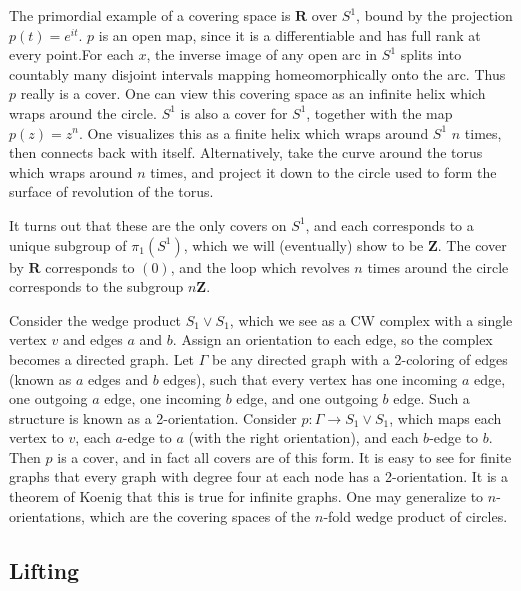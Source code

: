 \begin{example}
    The primordial example of a covering space is $\mathbf{R}$ over $S^1$, bound by the projection $p(t) = e^{it}$. $p$ is an open map, since it is a differentiable and has full rank at every point.For each $x$, the inverse image of any open arc in $S^1$ splits into countably many disjoint intervals mapping homeomorphically onto the arc. Thus $p$ really is a cover. One can view this covering space as an infinite helix which wraps around the circle. $S^1$ is also a cover for $S^1$, together with the map $p(z) = z^n$. One visualizes this as a finite helix which wraps around $S^1$ $n$ times, then connects back with itself. Alternatively, take the curve around the torus which wraps around $n$ times, and project it down to the circle used to form the surface of revolution of the torus.
\end{example}

It turns out that these are the only covers on $S^1$, and each corresponds to a unique subgroup of $\pi_1(S^1)$, which we will (eventually) show to be $\mathbf{Z}$. The cover by $\mathbf{R}$ corresponds to $(0)$, and the loop which revolves $n$ times around the circle corresponds to the subgroup $n \mathbf{Z}$.

\begin{example}
    Consider the wedge product $S_1 \vee S_1$, which we see as a CW complex with a single vertex $v$ and edges $a$ and $b$. Assign an orientation to each edge, so the complex becomes a directed graph. Let $\Gamma$ be any directed graph with a 2-coloring of edges (known as $a$ edges and $b$ edges), such that every vertex has one incoming $a$ edge, one outgoing $a$ edge, one incoming $b$ edge, and one outgoing $b$ edge. Such a structure is known as a 2-orientation. Consider $p: \Gamma \to S_1 \vee S_1$, which maps each vertex to $v$, each $a$-edge to $a$ (with the right orientation), and each $b$-edge to $b$. Then $p$ is a cover, and in fact all covers are of this form. It is easy to see for finite graphs that every graph with degree four at each node has a 2-orientation. It is a theorem of Koenig that this is true for infinite graphs. One may generalize to $n$-orientations, which are the covering spaces of the $n$-fold wedge product of circles.
\end{example}

\subsection{Lifting}

